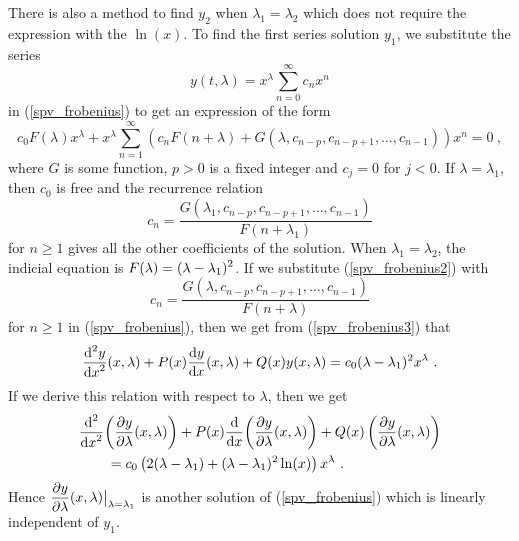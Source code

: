 There is also a method to find $y_2$ when $\lambda_1=\lambda_2$ which
does not require the expression with the $\ln(x)$.  To find the
first series solution $y_1$, we substitute the series
\begin{equation} \label{spv_frobenius2}
y(t,\lambda) = x^\lambda \sum_{n=0}^\infty c_n x^n 
\end{equation}
in (\ref{spv_frobenius}) to get an expression of the form
\begin{equation} \label{spv_frobenius3}
c_0 F(\lambda) x^\lambda + x^\lambda \sum_{n=1}^\infty
\left(c_n F(n+\lambda) +
G(\lambda,c_{n-p},c_{n-p+1},\ldots,c_{n-1})\right) x^n = 0 \  ,
\end{equation}
where $G$ is some function, $p>0$ is a fixed integer and $c_j = 0$ for
$j<0$.  If $\lambda=\lambda_1$, then $c_0$ is free and the recurrence
relation
\[
c_n = \frac{G(\lambda_1,c_{n-p},c_{n-p+1},\ldots,c_{n-1})}
{F(n+\lambda_1)}
\]
for $n\geq 1$ gives all the other coefficients of the solution.  When
$\lambda_1=\lambda_2$, the indicial equation is
$\DS F(\lambda) = (\lambda-\lambda_1)^2$.  If we substitute
(\ref{spv_frobenius2}) with
\[
c_n = \frac{G(\lambda,c_{n-p},c_{n-p+1},\ldots,c_{n-1})}{F(n+\lambda)}
\]
for $n \geq 1$ in (\ref{spv_frobenius}), then we get from
(\ref{spv_frobenius3}) that
\[
\dydxn{y}{x}{2}(x,\lambda) + P(x) \dydx{y}{x}(x,\lambda)
+ Q(x) y(x,\lambda) = c_0(\lambda-\lambda_1)^2x^{\lambda} \ .
\]
If we derive this relation with respect to $\lambda$, then we get
\begin{align*}
& \dfdxn{\left( \pdydx{y}{\lambda}(x,\lambda) \right)}{x}{2}
+ P(x) \dfdx{\left( \pdydx{y}{\lambda}(x,\lambda) \right)}{x}
+ Q(x) \left( \pdydx{y}{\lambda}(x,\lambda) \right) \\
&\qquad = c_0\left(2(\lambda-\lambda_1) + (\lambda-\lambda_1)^2\ln(x)\right)
x^{\lambda} \ .
\end{align*}
Hence $\DS \pdydx{y}{\lambda}(x,\lambda)\big|_{\lambda=\lambda_1}$
is another solution of (\ref{spv_frobenius}) which is linearly
independent of $y_1$.

